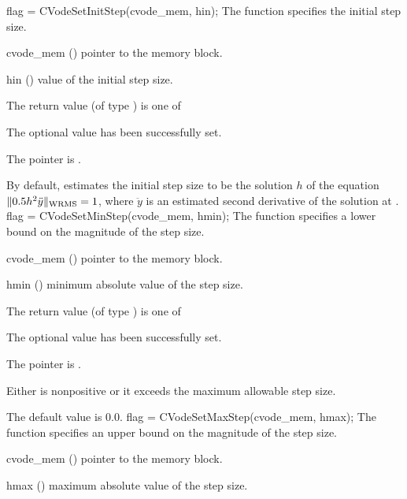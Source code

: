 {
flag = CVodeSetInitStep(cvode\_mem, hin);
}
{
  The function  specifies the initial step size.
}
{
  \begin{args}
  \item[cvode\_mem] ()
    pointer to the {\cvodes} memory block.
  \item[hin] ()
    value of the initial step size.
  \end{args}
}
{
  The return value  (of type ) is one of
  \begin{args}
  \item[\Id{CV\_SUCCESS}] 
    The optional value has been successfully set.
  \item[\Id{CV\_MEM\_NULL}]
    The  pointer is .
  \end{args}
}
{
  By default, {\cvodes} estimates the initial step size to be the solution $h$ 
  of the equation $\| 0.5 h^2 {\ddot y} \|_{\mbox{\scriptsize WRMS}} = 1$,
  where ${\ddot y}$ is an estimated second derivative of the solution at .
}
{
flag = CVodeSetMinStep(cvode\_mem, hmin);
}
{
  The function  specifies a lower bound on the magnitude
  of the step size.
}
{
  \begin{args}
  \item[cvode\_mem] ()
    pointer to the {\cvodes} memory block.
  \item[hmin] ()
    minimum absolute value of the step size.
  \end{args}
}
{
  The return value  (of type ) is one of
  \begin{args}
  \item[\Id{CV\_SUCCESS}] 
    The optional value has been successfully set.
  \item[\Id{CV\_MEM\_NULL}]
    The  pointer is .
  \item[\Id{CV\_ILL\_INPUT}]
    Either  is nonpositive or it exceeds the maximum allowable step size.
  \end{args}
}
{
  The default value is $0.0$.
}
{
flag = CVodeSetMaxStep(cvode\_mem, hmax);
}
{
  The function  specifies an upper bound on the magnitude
  of the step size.
}
{
  \begin{args}
  \item[cvode\_mem] ()
    pointer to the {\cvodes} memory block.
  \item[hmax] ()
    maximum absolute value of the step size.
  \end{args}
}
